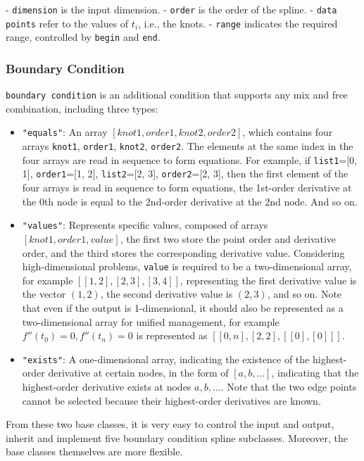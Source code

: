 \documentclass[a4paper]{article}
\begin{document}
- \texttt{dimension} is the input dimension.
- \texttt{order} is the order of the spline.
- \texttt{data points} refer to the values of $t_i$, i.e., the knots.
- \texttt{range} indicates the required range, controlled by \texttt{begin} and \texttt{end}.

\subsubsection*{Boundary Condition}

\texttt{boundary condition} is an additional condition that supports any mix and free combination, including three types:

\begin{itemize}
    \item \texttt{"equals"}: An array \([knot1, order1, knot2, order2]\), which contains four arrays \texttt{knot1}, \texttt{order1}, \texttt{knot2}, \texttt{order2}. The elements at the same index in the four arrays are read in sequence to form equations. For example, if \texttt{list1}=[0, 1], \texttt{order1}=[1, 2], \texttt{list2}=[2, 3], \texttt{order2}=[2, 3], then the first element of the four arrays is read in sequence to form equations, the 1st-order derivative at the 0th node is equal to the 2nd-order derivative at the 2nd node. And so on.
    \item \texttt{"values"}: Represents specific values, composed of arrays \([knot1, order1, value]\), the first two store the point order and derivative order, and the third stores the corresponding derivative value. Considering high-dimensional problems, \texttt{value} is required to be a two-dimensional array, for example \([ [1, 2], [2, 3], [3, 4] ]\), representing the first derivative value is the vector \((1, 2)\), the second derivative value is \((2, 3)\), and so on. Note that even if the output is 1-dimensional, it should also be represented as a two-dimensional array for unified management, for example \(f''(t_0) = 0, f''(t_n) = 0\) is represented as \([ [0, n], [2, 2], [[0], [0]] ]\).
    \item \texttt{"exists"}: A one-dimensional array, indicating the existence of the highest-order derivative at certain nodes, in the form of \([a, b, \dots]\), indicating that the highest-order derivative exists at nodes \(a, b, \dots\). Note that the two edge points cannot be selected because their highest-order derivatives are known.
\end{itemize}

From these two base classes, it is very easy to control the input and output, inherit and implement five boundary condition spline subclasses. Moreover, the base classes themselves are more flexible.
\end{document}
